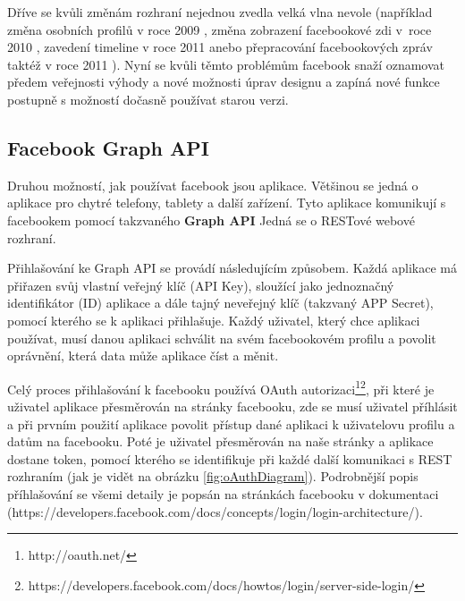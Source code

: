 \documentclass[thesis=M,czech]{FITthesis}[2013/05/10]
\begin{document}
Dříve se kvůli změnám rozhraní nejednou zvedla velká vlna nevole (například změna osobních profilů v roce 2009 \cite{fbNewHomePage}, změna zobrazení facebookové zdi v~roce  2010 \cite{fbNewNavigation}, zavedení timeline v roce 2011 \cite{fbNewTimeline} anebo přepracování facebookových zpráv taktéž v roce 2011 \cite{fbNewMessages}). Nyní se kvůli těmto problémům facebook snaží oznamovat předem veřejnosti výhody a nové možnosti úprav designu a zapíná nové funkce postupně s možností dočasně používat starou verzi.  

\subsection{Facebook Graph API}
Druhou možností, jak používat facebook jsou aplikace. Většinou se jedná o aplikace pro chytré telefony, tablety a další zařízení. Tyto aplikace komunikují s facebookem pomocí takzvaného \textbf{Graph API} \cite{fbGraphApi} Jedná se o RESTové webové rozhraní.

Přihlašování ke Graph API se provádí následujícím způsobem. Každá aplikace má přiřazen svůj vlastní veřejný klíč (API Key), sloužící jako jednoznačný identifikátor (ID) aplikace a dále tajný neveřejný klíč (takzvaný APP Secret), pomocí kterého se k aplikaci přihlašuje. Každý uživatel, který chce aplikaci používat, musí danou aplikaci schválit na svém facebookovém profilu a povolit oprávnění, která data může aplikace číst a měnit.

Celý proces přihlašování k facebooku používá OAuth autorizaci\footnote{http://oauth.net/}\footnote{https://developers.facebook.com/docs/howtos/login/server-side-login/}, při které je uživatel aplikace přesměrován na stránky facebooku, zde se musí uživatel příhlásit a při prvním použití aplikace povolit přístup dané aplikaci k uživatelovu profilu a datům na facebooku. Poté je uživatel přesměrován na naše stránky a aplikace dostane token, pomocí kterého se identifikuje při každé další komunikaci s REST rozhraním  (jak je vidět na obrázku \ref{fig:oAuthDiagram}). Podrobnější popis příhlašování se všemi detaily je popsán na stránkách facebooku v dokumentaci \newline(https://developers.facebook.com/docs/concepts/login/login-architecture/). 
\end{document}
